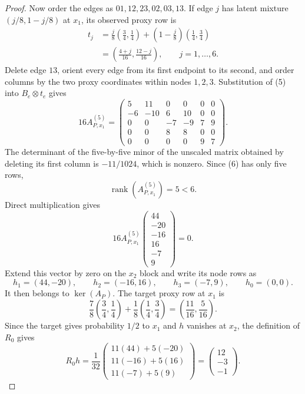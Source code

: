 \documentclass{article}
\begin{document}
\begin{proof}
Now order the edges as \(01,12,23,02,03,13\).  If edge \(j\) has latent mixture \((j/8,1-j/8)\) at \(x_1\), its observed proxy row is
\[
\begin{aligned}
t_j
&=\frac j8\left(\frac34,\frac14\right)
+\left(1-\frac j8\right)\left(\frac14,\frac34\right)\\
&=\left(\frac{4+j}{16},\frac{12-j}{16}\right),
\qquad j=1,\ldots,6.
\end{aligned}
\tag{5}
\]
Delete edge \(13\), orient every edge from its first endpoint to its second, and order columns by the two proxy coordinates within nodes \(1,2,3\).  Substitution of (5) into \(B_e\otimes t_e\) gives
\[
16A_{P,x_1}^{(5)}=
\begin{pmatrix}
5&11&0&0&0&0\\
-6&-10&6&10&0&0\\
0&0&-7&-9&7&9\\
0&0&8&8&0&0\\
0&0&0&0&9&7
\end{pmatrix}.
\tag{6}
\]
The determinant of the five-by-five minor of the unscaled matrix obtained by deleting its first column is \(-11/1024\), which is nonzero.  Since (6) has only five rows,
\[
\operatorname{rank}(A_{P,x_1}^{(5)})=5<6.
\tag{7}
\]
Direct multiplication gives
\[
16A_{P,x_1}^{(5)}
\begin{pmatrix}44\\-20\\-16\\16\\-7\\9\end{pmatrix}
=0.
\]
Extend this vector by zero on the \(x_2\) block and write its node rows as
\[
h_1=(44,-20),\qquad h_2=(-16,16),\qquad h_3=(-7,9),
\qquad h_0=(0,0).
\]
It then belongs to \(\ker(A_P)\).  The target proxy row at \(x_1\) is
\[
\frac78\left(\frac34,\frac14\right)
+\frac18\left(\frac14,\frac34\right)
=\left(\frac{11}{16},\frac5{16}\right).
\]
Since the target gives probability \(1/2\) to \(x_1\) and \(h\) vanishes at \(x_2\), the definition of \(R_0\) gives
\[
R_0h
=\frac1{32}
\begin{pmatrix}
11(44)+5(-20)\\
11(-16)+5(16)\\
11(-7)+5(9)
\end{pmatrix}
=\begin{pmatrix}12\\-3\\-1\end{pmatrix}.
\tag{8}
\]


\end{proof}
\end{document}
